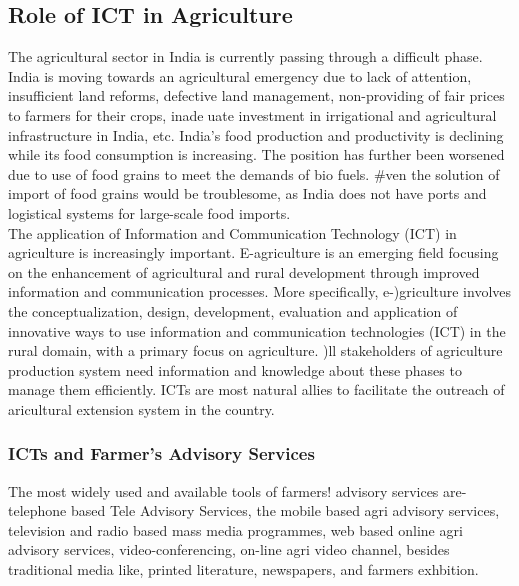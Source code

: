 \documentclass[12pt]{homework}
\begin{document}
\subsection{Role of ICT in Agriculture}


The agricultural sector in India is currently passing through a difficult phase. India is moving towards an agricultural emergency due to lack of attention, insufficient land reforms, defective land management, non-providing of fair prices to farmers for their crops, inadeuate investment in irrigational and agricultural infrastructure in India, etc. India's food production and productivity is declining while its food consumption is increasing. The position has further been worsened due to use of food grains to meet the demands of bio fuels. #ven the solution of import of food grains would be troublesome, as India does not have ports and logistical systems for large-scale food imports.\\

The application of Information and Communication Technology (ICT) in agriculture is increasingly important. E-agriculture is an emerging field focusing on the enhancement of agricultural and rural development through improved information and communication processes. More specifically, e-)griculture involves the conceptualization, design, development, evaluation and application of innovative ways to use information and communication technologies (ICT) in the rural domain, with a  primary focus on agriculture. )ll stakeholders of agriculture production system need information and knowledge about these phases to manage them efficiently. ICTs are most natural allies to facilitate the outreach of aricultural extension system in the country.\\

\subsubsection{ICTs and Farmer's Advisory Services}
The most widely used and available tools of farmers! advisory services are- telephone based Tele Advisory Services, the mobile based agri advisory services, television and radio based mass media  programmes, web based online agri advisory services, video-conferencing, on-line agri video channel, besides traditional media like, printed literature, newspapers, and farmers exhbition.\\
\end{document}
